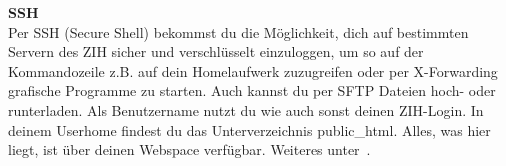 \begin{multicols}{2}




\textbf{SSH} \\
Per SSH (Secure Shell) bekommst du die Möglichkeit, dich auf bestimmten Servern des ZIH sicher und verschlüsselt einzuloggen, um so auf der Kommandozeile z.B. auf dein Homelaufwerk zuzugreifen oder per X-Forwarding grafische Programme zu starten.
Auch kannst du per SFTP Dateien hoch- oder runterladen.
Als Benutzername nutzt du wie auch sonst deinen ZIH-Login.
In deinem Userhome findest du das Unterverzeichnis public\_html.
Alles, was hier liegt, ist über deinen Webspace verfügbar.
Weiteres unter~.




% 


\end{multicols}
